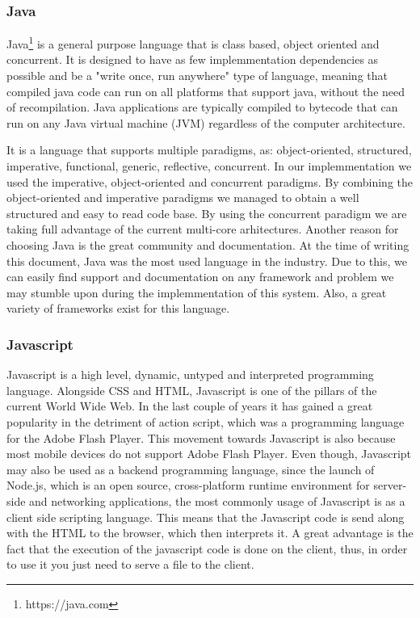 \subsubsection{Java}
\label{sec:programming-languages-java}
Java\footnote{https://java.com} is a general purpose language that is class based, object oriented and concurrent. 
It is designed to have as few implemmentation dependencies as possible and be a "write once, run anywhere" type of language, meaning that compiled java code can run on all platforms that support java, without the need of recompilation.
Java applications are typically compiled to bytecode that can run on any Java virtual machine (JVM) regardless of the computer architecture.

It is a language that supports multiple paradigms, as:  object-oriented, structured, imperative, functional, generic, reflective, concurrent. In our implemmentation we used the imperative, object-oriented and concurrent paradigms. By combining the object-oriented and imperative paradigms we managed to obtain a well structured and easy to read code base. By using the concurrent paradigm we are taking full advantage of the current multi-core arhitectures.
Another reason for choosing Java is the great community and documentation. At the time of writing this document, Java was the most used language in the industry. Due to this, we can easily find support and documentation on any framework and problem we may stumble upon during the implemmentation of this system. Also, a great variety of frameworks exist for this language.

\subsubsection{Javascript}
\label{sec:programming-languages-javascript}
Javascript is a high level, dynamic, untyped and interpreted programming language. Alongside CSS and HTML, Javascript is one of the pillars of the current World Wide Web. In the last couple of years it has gained a great popularity in the detriment of action script, which was a programming language for the Adobe Flash Player. This movement towards Javascript is also because most mobile devices do not support Adobe Flash Player.
Even though, Javascript may also be used as a backend programming language, since the launch of Node.js, which is  an open source, cross-platform runtime environment for server-side and networking applications, the most commonly usage of Javascript is as a client side scripting language. This means that the Javascript code is send along with the HTML to the browser, which then interprets it. A great advantage is the fact that the execution of the javascript code is done on the client, thus, in order to use it you just need to serve a file to the client.

